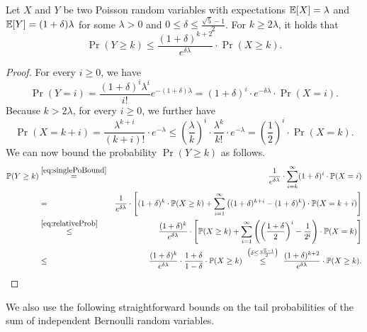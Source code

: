 \begin{lemma}\label{lemma:PoissonShift}
  Let $X$ and $Y$ be two Poisson random variables with expectations $\operatorname{\mathbb{E}}[X]=\lambda$ and $\operatorname{\mathbb{E}}[Y]=(1+\delta)\lambda$ for some $\lambda>0$ and $0\leq \delta\leq \frac{\sqrt{5}-1}{2}$. For $k\geq 2\lambda$, it holds that
  \[
  \Pr(Y\geq k) \leq \frac{(1+\delta)^{k+2}}{e^{\delta\lambda}}\cdot \Pr(X\geq k).
  \]
\end{lemma}
\begin{proof}
  For every $i\geq 0$, we have
  \begin{equation}\label{eq:singlePoBound}
      \Pr(Y = i) = \frac{(1+\delta)^i\lambda^i}{i!}e^{-(1+\delta)\lambda} =
      (1+\delta)^i\cdot e^{-\delta \lambda}\cdot \Pr(X = i).
  \end{equation}
  Because $k>2\lambda$, for every $i\geq 0$, we further have
  \begin{equation}\label{eq:relativeProb}
      \Pr(X = k + i) = \frac{\lambda^{k+i}}{(k+i)!}\cdot e^{-\lambda} \leq
      \left(\frac{\lambda}{k}\right)^i\cdot \frac{\lambda^k}{k!}\cdot e^{-\lambda} =
      \left(\frac{1}{2}\right)^i\cdot \Pr(X = k).
  \end{equation}
  We can now bound the probability $\Pr(Y\geq k)$ as follows.
  \begin{eqnarray*}
      \Pr(Y \geq k) & \stackrel{\eqref{eq:singlePoBound}}{=} &
      \frac{1}{e^{\delta\lambda}}\cdot \sum_{i=k}^\infty (1+\delta)^i\cdot \Pr(X=i)\\
      & = & \frac{1}{e^{\delta\lambda}}\cdot\left[
      (1+\delta)^k\cdot \Pr(X\geq k) + \sum_{i=1}^\infty 
      \left((1+\delta)^{k+i}-(1+\delta)^k\right)\cdot \Pr(X=k+i)
      \right]\\
      & \stackrel{\eqref{eq:relativeProb}}{\leq}& \frac{(1+\delta)^k}{e^{\delta\lambda}}\cdot\left[
      \Pr(X\geq k) + \sum_{i=1}^\infty 
      \left(\left(\frac{1+\delta}{2}\right)^{i}-\frac{1}{2^i}\right)\cdot \Pr(X=k)
      \right]\\
      & \leq & \frac{(1+\delta)^k}{e^{\delta\lambda}}\cdot
      \frac{1+\delta}{1-\delta}\cdot \Pr(X\geq k)
      \ \stackrel{\big(\delta\leq \frac{\sqrt{5}-1}{2}\big)}{\leq}\ 
      \frac{(1+\delta)^{k+2}}{e^{\delta\lambda}}\cdot \Pr(X\geq k).
  \end{eqnarray*}
\end{proof}

We also use the following straightforward bounds on the tail probabilities of the sum of independent Bernoulli random variables.

